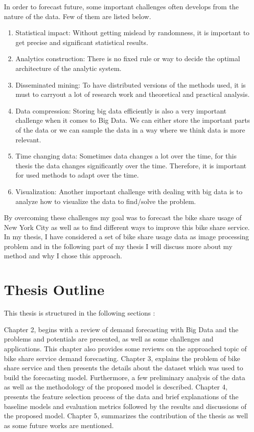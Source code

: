 In order to forecast future,  some important challenges often develops from the nature of the data. Few of them are listed below.


\begin{enumerate} 
\item Statistical impact:  Without getting mislead by randomness, it is important to get precise and significant statistical results. 
\item Analytics construction: There is no fixed rule or way to decide the optimal architecture of the analytic system. 
\item Disseminated mining: To have distributed versions of the methods used, it is must to carryout a lot of research work and theoretical and practical analysis. 
\item Data compression: Storing big data efficiently is also a very important challenge when it comes to Big Data. We can either store the important parts of the data or we can sample the data in a way where we think data is more relevant.
\item Time changing data: Sometimes data changes a lot over the time, for this thesis the data changes significantly over the time. Therefore, it is important for used methods to adapt over the time.
\item Visualization: Another important challenge with dealing with big data is to analyze how to visualize the data to find/solve the problem. 
\end{enumerate}

By overcoming these challenges my goal was to forecast the bike share usage of New York City as well as to find different ways to improve this bike share service. In my thesis, I have considered a set of bike share usage data as image processing problem and in the following part of my thesis I will discuss more about my method and why I chose this approach.



\section{Thesis Outline}
\label{outline}

This thesis is structured in the following sections :

Chapter 2, begins with a review of demand forecasting with Big Data and the problems and potentials are presented, as well as some challenges and applications. This chapter also provides some reviews on the approached topic of bike share service demand forecasting.  
Chapter 3, explains the problem of bike share service and then presents the details about the dataset which was used to build the forecasting model. Furthermore, a few preliminary analysis of the data as well as the methodology of the proposed model is described.    
Chapter 4, presents the feature selection process of the data and brief explanations of the baseline models and evaluation metrics followed by the results and discussions of the proposed model. 
Chapter 5, summarizes the contribution of the thesis as well as some future works are mentioned. 







